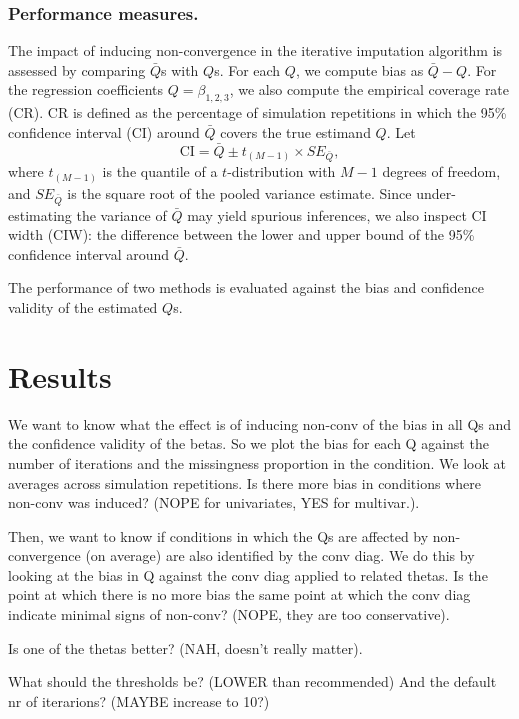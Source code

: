 \documentclass[Royal,times,sageh]{sagej}
\begin{document}
\hypertarget{performance-measures.}{%
\subsubsection{Performance measures.}\label{performance-measures.}}

The impact of inducing non-convergence in the iterative imputation
algorithm is assessed by comparing \(\bar{Q}\)s with \(Q\)s. For each
\(Q\), we compute bias as \(\bar{Q} - Q\). For the regression
coefficients \(Q=\beta_{1,2,3}\), we also compute the empirical coverage
rate (CR). CR is defined as the percentage of simulation repetitions in
which the 95\% confidence interval (CI) around \(\bar{Q}\) covers the
true estimand \(Q\). Let
\[\text{CI} = \bar{Q} \pm t_{(M-1)} \times SE_{\bar{Q}},\] where
\(t_{(M-1)}\) is the quantile of a \(t\)-distribution with \(M-1\)
degrees of freedom, and \(SE_{\bar{Q}}\) is the square root of the
pooled variance estimate. Since under-estimating the variance of
\(\bar{Q}\) may yield spurious inferences, we also inspect CI width
(CIW): the difference between the lower and upper bound of the 95\%
confidence interval around \(\bar{Q}\).

The performance of two methods is evaluated against the bias and
confidence validity of the estimated \(Q\)s.

\hypertarget{results}{%
\section{Results}\label{results}}

We want to know what the effect is of inducing non-conv of the bias in
all Qs and the confidence validity of the betas. So we plot the bias for
each Q against the number of iterations and the missingness proportion
in the condition. We look at averages across simulation repetitions. Is
there more bias in conditions where non-conv was induced? (NOPE for
univariates, YES for multivar.).

Then, we want to know if conditions in which the Qs are affected by
non-convergence (on average) are also identified by the conv diag. We do
this by looking at the bias in Q against the conv diag applied to
related thetas. Is the point at which there is no more bias the same
point at which the conv diag indicate minimal signs of non-conv? (NOPE,
they are too conservative).

Is one of the thetas better? (NAH, doesn't really matter).

What should the thresholds be? (LOWER than recommended) And the default
nr of iterarions? (MAYBE increase to 10?)
\end{document}
